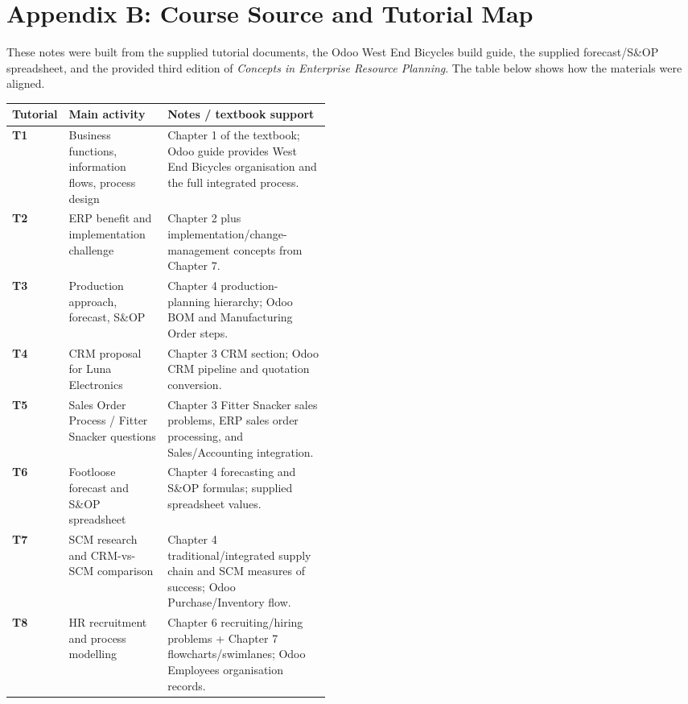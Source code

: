 \chapter*{Appendix B: Course Source and Tutorial Map}

These notes were built from the supplied tutorial documents, the Odoo West End Bicycles build guide, the supplied forecast/S\&OP spreadsheet, and the provided third edition of \emph{Concepts in Enterprise Resource Planning}. The table below shows how the materials were aligned.

\begin{erptable}
\begin{tabularx}{\linewidth}{@{}>{\bfseries\leavevmode\color{ERPNavy}}p{0.15\linewidth}p{0.31\linewidth}X@{}}
\toprule
\rowcolor{ERPPaleBlue!92}
Tutorial & Main activity & Notes / textbook support \\
\midrule
T1 & Business functions, information flows, process design & Chapter 1 of the textbook; Odoo guide provides West End Bicycles organisation and the full integrated process. \\
T2 & ERP benefit and implementation challenge & Chapter 2 plus implementation/change-management concepts from Chapter 7. \\
T3 & Production approach, forecast, S\&OP & Chapter 4 production-planning hierarchy; Odoo BOM and Manufacturing Order steps. \\
T4 & CRM proposal for Luna Electronics & Chapter 3 CRM section; Odoo CRM pipeline and quotation conversion. \\
T5 & Sales Order Process / Fitter Snacker questions & Chapter 3 Fitter Snacker sales problems, ERP sales order processing, and Sales/Accounting integration. \\
T6 & Footloose forecast and S\&OP spreadsheet & Chapter 4 forecasting and S\&OP formulas; supplied spreadsheet values. \\
T7 & SCM research and CRM-vs-SCM comparison & Chapter 4 traditional/integrated supply chain and SCM measures of success; Odoo Purchase/Inventory flow. \\
T8 & HR recruitment and process modelling & Chapter 6 recruiting/hiring problems + Chapter 7 flowcharts/swimlanes; Odoo Employees organisation records. \\
\bottomrule
\end{tabularx}
\end{erptable}


